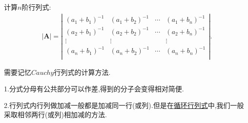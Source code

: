 \documentclass[lang=cn,newtx,10pt,scheme=chinese]{elegantbook}
\begin{document}
\begin{proposition}\label{Cauchy行列式}
计算$n$阶行列式:
\begin{gather}
|\boldsymbol{A}|=\left| \begin{matrix}
(a_1+b_1)^{-1}&		(a_1+b_2)^{-1}&		\cdots&		(a_1+b_n)^{-1}\\
(a_2+b_1)^{-1}&		(a_2+b_2)^{-1}&		\cdots&		(a_2+b_n)^{-1}\\
\vdots&		\vdots&		&		\vdots\\
(a_n+b_1)^{-1}&		(a_n+b_2)^{-1}&		\cdots&		(a_n+b_n)^{-1}\\
\end{matrix} \right|.
\nonumber
\end{gather}
\end{proposition}
\begin{note}
需要记忆$Cauchy$行列式的计算方法.

1.分式分母有公共部分可以作差,得到的分子会变得相对简便.

2.行列式内行列做加减一般都是加减同一行(或列).但是在\hyperlink{循环行列式}{循环行列式}中,我们一般采取相邻两行(或列)相加减的方法.
\end{note}
\end{document}
